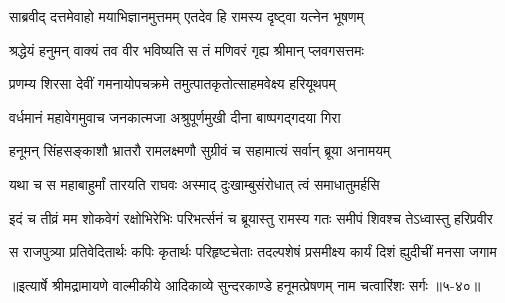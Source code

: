\twolineshloka
{साब्रवीद् दत्तमेवाहो मयाभिज्ञानमुत्तमम्}
{एतदेव हि रामस्य दृष्ट्वा यत्नेन भूषणम्} %

\twolineshloka
{श्रद्धेयं हनुमन् वाक्यं तव वीर भविष्यति}
{स तं मणिवरं गृह्य श्रीमान् प्लवगसत्तमः} %

\twolineshloka
{प्रणम्य शिरसा देवीं गमनायोपचक्रमे}
{तमुत्पातकृतोत्साहमवेक्ष्य हरियूथपम्} %

\twolineshloka
{वर्धमानं महावेगमुवाच जनकात्मजा}
{अश्रुपूर्णमुखी दीना बाष्पगद्गदया गिरा} %

\twolineshloka
{हनूमन् सिंहसङ्काशौ भ्रातरौ रामलक्ष्मणौ}
{सुग्रीवं च सहामात्यं सर्वान् ब्रूया अनामयम्} %

\twolineshloka
{यथा च स महाबाहुर्मां तारयति राघवः}
{अस्माद् दुःखाम्बुसंरोधात् त्वं समाधातुमर्हसि} %

\twolineshloka
{इदं च तीव्रं मम शोकवेगं रक्षोभिरेभिः परिभर्त्सनं च}
{ब्रूयास्तु रामस्य गतः समीपं शिवश्च तेऽध्वास्तु हरिप्रवीर} %

\twolineshloka
{स राजपुत्र्या प्रतिवेदितार्थः कपिः कृतार्थः परिहृष्टचेताः}
{तदल्पशेषं प्रसमीक्ष्य कार्यं दिशं ह्युदीचीं मनसा जगाम} %


॥इत्यार्षे श्रीमद्रामायणे वाल्मीकीये आदिकाव्ये सुन्दरकाण्डे हनूमत्प्रेषणम् नाम चत्वारिंशः सर्गः ॥५-४०॥
